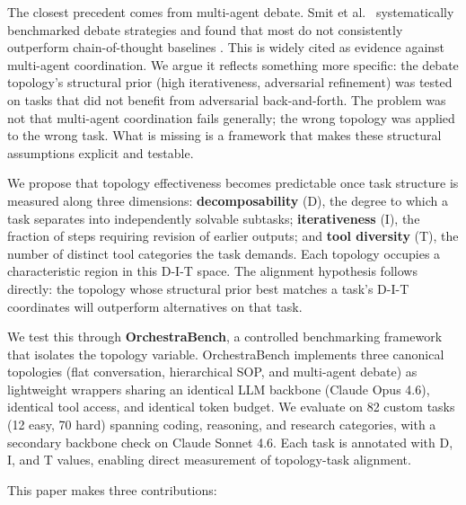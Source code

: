 The closest precedent comes from multi-agent debate. Smit et al.~\cite{smit_2024} systematically benchmarked debate strategies and found that most do not consistently outperform chain-of-thought baselines \cite{wei_2022}. This is widely cited as evidence against multi-agent coordination. We argue it reflects something more specific: the debate topology's structural prior (high iterativeness, adversarial refinement) was tested on tasks that did not benefit from adversarial back-and-forth. The problem was not that multi-agent coordination fails generally; the wrong topology was applied to the wrong task. What is missing is a framework that makes these structural assumptions explicit and testable.

We propose that topology effectiveness becomes predictable once task structure is measured along three dimensions: \textbf{decomposability} (D), the degree to which a task separates into independently solvable subtasks; \textbf{iterativeness} (I), the fraction of steps requiring revision of earlier outputs; and \textbf{tool diversity} (T), the number of distinct tool categories the task demands. Each topology occupies a characteristic region in this D-I-T space. The alignment hypothesis follows directly: the topology whose structural prior best matches a task's D-I-T coordinates will outperform alternatives on that task.

We test this through \textbf{OrchestraBench}, a controlled benchmarking framework that isolates the topology variable. OrchestraBench implements three canonical topologies (flat conversation, hierarchical SOP, and multi-agent debate) as lightweight wrappers sharing an identical LLM backbone (Claude Opus 4.6), identical tool access, and identical token budget. We evaluate on 82 custom tasks (12 easy, 70 hard) spanning coding, reasoning, and research categories, with a secondary backbone check on Claude Sonnet 4.6. Each task is annotated with D, I, and T values, enabling direct measurement of topology-task alignment.

This paper makes three contributions:

